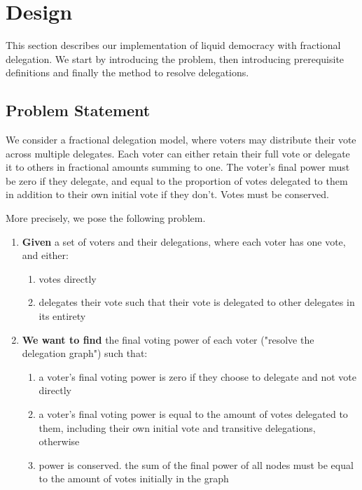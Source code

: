 \graphicspath{ {./figures/} }

\chapter{Design}
\label{chap:design}

This section describes our implementation of liquid democracy with fractional delegation. We start by introducing the problem, then introducing prerequisite definitions and finally the method to resolve delegations. 

\section{Problem Statement}

We consider a fractional delegation model, where voters may distribute their vote across multiple  delegates. Each voter can either retain their full vote or delegate it to others in fractional amounts summing to one. The voter's final power must be zero if they delegate, and equal to the proportion of votes delegated to them in addition to their own initial vote if they don't. Votes must be conserved.

More precisely, we pose the following problem.

\begin{enumerate}
\item \textbf{Given} a set of voters and their delegations, where each voter has one vote, and either:
\begin{enumerate}
\item votes directly 
\item delegates their vote such that their vote is delegated to other delegates in its entirety
\end{enumerate}
\item \textbf{We want to find} the final voting power of each voter ("resolve the delegation graph") such that:
\begin{enumerate}
\item a voter's final voting power is zero if they choose to delegate and not vote directly 
\item a voter's final voting power is equal to the amount of votes delegated to them, including their own initial vote and transitive delegations, otherwise
\item power is conserved. the sum of the final power of all nodes must be equal to the amount of votes initially in the graph
\end{enumerate}
\end{enumerate}

